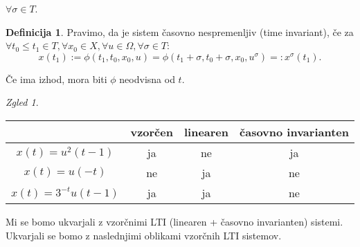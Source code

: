 \documentclass[a4paper, 12pt]{book}
\theoremstyle{definition}
\newtheorem{defn}[counter]{Definicija}
\theoremstyle{remark}
\newtheorem*{exmp}{Zgled}
\begin{document}
$\forall \sigma \in T$.
\begin{defn}
    Pravimo, da je sistem časovno nespremenljiv (time invariant), če za
    $\forall t_0 \leq t_1 \in T, \forall x_0 \in X, \forall u \in \Omega, \forall \sigma \in T$:
    \begin{equation*}
        x(t_1) := \phi(t_1, t_0, x_0, u) = \phi(t_1 + \sigma, t_0 + \sigma, x_0, u^{\sigma}) =: x^{\sigma}(t_1).
    \end{equation*}
\end{defn}
Če ima izhod, mora biti $\phi$ neodvisna od $t$.
\begin{exmp} \text{} \\
    \begin{center}
        \begin{tabular}{c | c c c}
             & vzorčen & linearen & časovno invarianten \\
            \hline
            $x(t) = u^2(t-1)$ & ja & ne & ja \\
            $x(t) = u(-t)$ & ne & ja & ne \\
            $x(t) = 3^{-t} u(t-1)$ & ja & ja & ne
        \end{tabular}
    \end{center}
\end{exmp}
Mi se bomo ukvarjali z vzorčnimi LTI (linearen + časovno invarianten) sistemi.
Ukvarjali se bomo z naslednjimi oblikami vzorčnih LTI sistemov.
\end{document}
